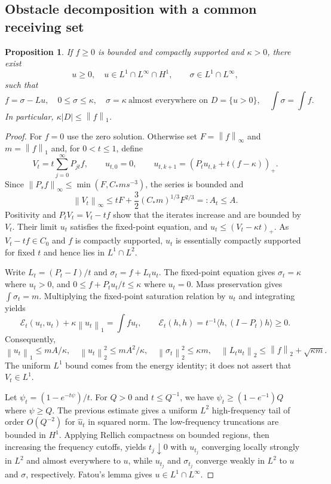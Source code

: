 \documentclass[11pt,a4paper]{article}
\newtheorem{proposition}[theorem]{Proposition}
\theoremstyle{definition}\newtheorem{definition}[theorem]{Definition}
\theoremstyle{remark}\newtheorem{remark}[theorem]{Remark}
\newcommand{\norm}[1]{\left\lVert#1\right\rVert}
\newcommand{\abs}[1]{\left|#1\right|}
\newcommand{\pos}[1]{(#1)_+}
\begin{document}
\subsection{Obstacle decomposition with a common receiving set}
\begin{proposition}\label{prop:obstacle}
If $f\ge0$ is bounded and compactly supported and $\kappa>0$, there exist
\[
 u\ge0,\quad u\in L^1\cap L^\infty\cap H^1,
 \qquad \sigma\in L^1\cap L^\infty,
\]
such that
\begin{equation}\label{eq:obstacle}
 f=\sigma-Lu,\quad 0\le\sigma\le\kappa,
 \quad \sigma=\kappa\ \text{almost everywhere on }D=\{u>0\},
 \quad \int\sigma=\int f.
\end{equation}
In particular, $\kappa\abs D\le\norm f_1$.
\end{proposition}
\begin{proof}
For $f=0$ use the zero solution. Otherwise set $F=\norm f_\infty$ and $m=\norm f_1$ and, for $0<t\le1$, define
\[
 V_t=t\sum_{j=0}^\infty P_{jt}f,
 \qquad u_{t,0}=0,\qquad
 u_{t,k+1}=\pos{P_tu_{t,k}+t(f-\kappa)}.
\]
Since $\norm{P_sf}_\infty\le\min(F,C_*ms^{-3})$, the series is bounded and
\begin{equation}\label{eq:Vbound}
 \norm{V_t}_\infty\le tF+\frac32(C_*m)^{1/3}F^{2/3}=:A_t\le A.
\end{equation}
Positivity and $P_tV_t=V_t-tf$ show that the iterates increase and are bounded by $V_t$. Their limit $u_t$ satisfies the fixed-point equation, and $u_t\le(V_t-\kappa t)_+$. As $V_t-tf\in C_0$ and $f$ is compactly supported, $u_t$ is essentially compactly supported for fixed $t$ and hence lies in $L^1\cap L^2$.

Write $L_t=(P_t-I)/t$ and $\sigma_t=f+L_tu_t$. The fixed-point equation gives $\sigma_t=\kappa$ where $u_t>0$, and $0\le f+P_tu_t/t\le\kappa$ where $u_t=0$. Mass preservation gives $\int\sigma_t=m$. Multiplying the fixed-point saturation relation by $u_t$ and integrating yields
\begin{equation}\label{eq:energy}
 \mathcal E_t(u_t,u_t)+\kappa\norm{u_t}_1=\int fu_t,
 \qquad \mathcal E_t(h,h)=t^{-1}\langle h,(I-P_t)h\rangle\ge0.
\end{equation}
Consequently,
\[
 \norm{u_t}_1\le mA/\kappa,\quad
 \norm{u_t}_2^2\le mA^2/\kappa,\quad
 \norm{\sigma_t}_2^2\le\kappa m,\quad
 \norm{L_tu_t}_2\le\norm f_2+\sqrt{\kappa m}.
\]
The uniform $L^1$ bound comes from the energy identity; it does not assert that $V_t\in L^1$.

Let $\psi_t=(1-e^{-t\psi})/t$. For $Q>0$ and $t\le Q^{-1}$, we have $\psi_t\ge(1-e^{-1})Q$ where $\psi\ge Q$. The previous estimate gives a uniform $L^2$ high-frequency tail of order $O(Q^{-2})$ for $\widehat u_t$ in squared norm. The low-frequency truncations are bounded in $H^1$. Applying Rellich compactness on bounded regions, then increasing the frequency cutoffs, yields $t_j\downarrow0$ with $u_{t_j}$ converging locally strongly in $L^2$ and almost everywhere to $u$, while $u_{t_j}$ and $\sigma_{t_j}$ converge weakly in $L^2$ to $u$ and $\sigma$, respectively. Fatou's lemma gives $u\in L^1\cap L^\infty$.


\end{proof}
\end{document}
